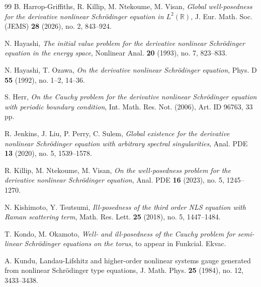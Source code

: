 \documentclass[%
11pt,  reqno]{amsart}
\newcommand{\R}{\mathbb{R}}
\numberwithin{equation}{section}
\numberwithin{theorem}{section}
\begin{document}
\begin{thebibliography}{99}
B. Harrop-Griffiths, R. Killip, M. Ntekoume, M. Visan,
{\it Global well-posedness for the derivative nonlinear Schr\"odinger equation in $L^2(\R)$},
J. Eur. Math. Soc. (JEMS) \textbf{28} (2026), no. 2, 843–924.

N. Hayashi,
{\it The initial value problem for the derivative nonlinear Schr\"odinger equation in the energy space},
Nonlinear Anal. \textbf{20} (1993), no. 7, 823–833.

N. Hayashi, T. Ozawa,
{\it On the derivative nonlinear Schr\"odinger equation},
Phys. D \textbf{55} (1992), no. 1--2, 14--36.

S. Herr,
{\it On the Cauchy problem for the derivative nonlinear Schr\"odinger equation with periodic boundary condition},
Int. Math. Res. Not. (2006), Art. ID 96763, 33 pp.


%
R. Jenkins, J. Liu, P. Perry, C. Sulem,
{\it Global existence for the derivative nonlinear Schr\"odinger equation with arbitrary spectral singularities},
Anal. PDE \textbf{13} (2020), no. 5, 1539–1578.


%

R. Killip, M. Ntekoume, M. Visan,
{\it On the well-posedness problem for the derivative nonlinear Schr\"odinger equation},
Anal. PDE \textbf{16} (2023), no. 5, 1245–1270.

N. Kishimoto, Y. Tsutsumi,
{\it Ill-posedness of the third order NLS equation with Raman scattering term},
Math. Res. Lett. \textbf{25} (2018), no. 5, 1447--1484.

T. Kondo, M. Okamoto,
{\it Well- and ill-posedness of the Cauchy problem for semi-linear Schr\"odinger equations on the torus}, to appear in Funkcial. Ekvac.

A. Kundu,
{Landau-Lifshitz and higher-order nonlinear systems gauge generated from nonlinear Schrödinger type equations},
J. Math. Phys. \textbf{25} (1984), no. 12, 3433–3438.



\end{thebibliography}
\end{document}
